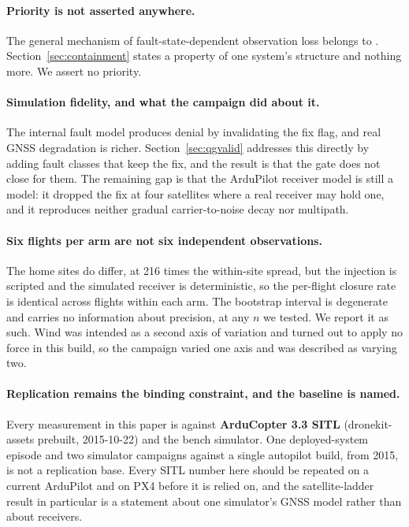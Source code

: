\documentclass[11pt,a4paper]{article}
\begin{document}
\paragraph{Priority is not asserted anywhere.} The general mechanism of
fault-state-dependent observation loss belongs to
\cite{dong2024statedependent}. Section~\ref{sec:containment} states a property
of one system's structure and nothing more. We assert no priority.

\paragraph{Simulation fidelity, and what the campaign did about it.} The
internal fault model produces denial by invalidating the fix flag, and real
GNSS degradation is richer. Section~\ref{sec:qgvalid} addresses this directly
by adding fault classes that keep the fix, and the result is that the gate
does not close for them. The remaining gap is that the ArduPilot receiver
model is still a model: it dropped the fix at four satellites where a real
receiver may hold one, and it reproduces neither gradual carrier-to-noise
decay nor multipath.

\paragraph{Six flights per arm are not six independent observations.} The home
sites do differ, at 216 times the within-site spread, but the injection is
scripted and the simulated receiver is deterministic, so the per-flight closure
rate is identical across flights within each arm. The bootstrap interval is
degenerate and carries no information about precision, at any $n$ we tested. We
report it as such. Wind was intended as a second axis of variation and turned
out to apply no force in this build, so the campaign varied one axis and was
described as varying two.

\paragraph{Replication remains the binding constraint, and the baseline is
named.} Every measurement in this paper is against \textbf{ArduCopter 3.3
SITL} (dronekit-assets prebuilt, 2015-10-22) and the bench simulator. One
deployed-system episode and two simulator campaigns against a single autopilot
build, from 2015, is not a replication base. Every SITL number here should be
repeated on a current ArduPilot and on PX4 before it is relied on, and the
satellite-ladder result in particular is a statement about one simulator's
GNSS model rather than about receivers.
\end{document}
